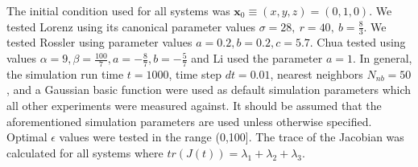             The initial condition used for all systems was $\mathbf{x}_0\equiv(x, y, z) = (0, 1, 0)$. We tested Lorenz using its canonical
            parameter values $\sigma=28, \ r=40, \ b=\frac{8}{3}$. We tested Rossler using parameter values $a=0.2,b=0.2,c=5.7$.
            Chua tested using values $\alpha=9,\beta=\frac{100}{7},a=-\frac{8}{7},b=-\frac{5}{7}$ and Li used
            the parameter $a=1$. In general, the simulation run time $t=1000$, time step $dt=0.01$, nearest neighbors
            $N_{nb}=50$, and a Gaussian basic function were used as default simulation parameters which all other experiments were measured against.
            It should be assumed that the aforementioned simulation parameters are used unless otherwise specified.
            Optimal $\epsilon$ values were tested in the range (0,100]. The trace of the Jacobian was calculated for all systems
            where $tr(J(t))=\lambda_1+\lambda_2+\lambda_3$.\\

